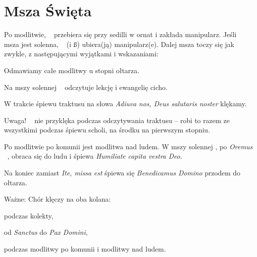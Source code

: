 \section{Msza Święta}

\begin{itemize*}
      \item Po modlitwie, \ii~ przebiera się przy sedilli w ornat i zakłada
            manipularz. Jeśli msza jest solenna, \dd~ (i \ss) ubiera(ją)
            manipularz(e). Dalej msza toczy się jak zwykle, z następującymi
            wyjątkami i wskazaniami:
            \begin{itemize*}
                  \item Odmawiamy całe modlitwy u stopni ołtarza.
                  \item Na mszy solennej \ii~ odczytuje lekcję i ewangelię
                  cicho.
                  \item W trakcie śpiewu traktusu na słowa \textit{Adiuva nos,
                        Deus salutaris noster} klękamy.
                  \item Uwaga! \ii~ nie przyklęka podczas odczytywania
                        traktusu --  robi to razem ze wszystkimi podczas śpiewu
                        scholi, na środku na pierwszym stopniu.
                  \item Po modlitwie po komunii jest modlitwa nad ludem. W mszy
                        solennej \dd, po \textit{Oremus} \ii~, obraca się do ludu
                        i śpiewa \textit{Humiliate capita vestra Deo}.
                  \item Na koniec zamiast \textit{Ite, missa est} śpiewa się
                        \textit{Benedicamus Domino} przodem do ołtarza.
                  \item Ważne: Chór klęczy na oba kolana:
                        \begin{itemize*}
                              \item podczas kolekty,
                              \item od \textit{Sanctus} do \textit{Pax Domini},
                              \item podczas modlitwy po komunii i modlitwy nad
                              ludem.
                        \end{itemize*}

            \end{itemize*}

\end{itemize*}